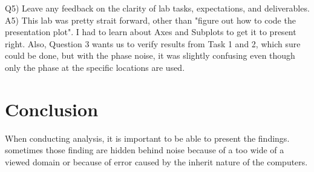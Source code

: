 \documentclass[12pt,a4paper]{article}
\begin{document}
Q5) Leave any feedback on the clarity of lab tasks, expectations, and deliverables.
A5) This lab was pretty strait forward, other than "figure out how to code the presentation plot".  I had to learn about Axes and Subplots to get it to present right.
Also, Question 3 wants us to  verify results from Task 1 and 2, which sure could be done, but with the phase noise, it was slightly confusing even though only the phase at the specific locations are used.



\section{Conclusion}\label{sec:res}
When conducting analysis, it is important to be able to present the findings.  sometimes those finding are hidden behind noise because of a too wide of a viewed domain or because of error caused by the inherit nature of the computers.





\end{document}
